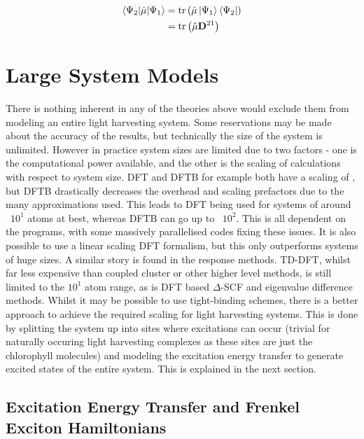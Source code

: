 \begin{equation}
\begin{split}    
\braket{\Psi_2|\hat{\mathbf{\mu}}|\Psi_1} &= \text{tr}\left(\hat{\mathbf{\mu}} \ket{\Psi_1} \bra{\Psi_2} \right) \\
&= \text{tr}\left( \hat{\mathbf{\mu}} \mathbf{D}^{21}\right)
\end{split}
\end{equation}
%
\section{Large System Models}
\label{sec:large_systems_theory}

There is nothing inherent in any of the theories above would exclude them from modeling
an entire light harvesting system. Some reservations may be made about the accuracy
of the results, but technically the size of the system is unlimited. However in 
practice system sizes are limited due to two factors - one is the computational 
power available, and the other is the scaling of calculations with respect to system
size. DFT and DFTB for example both have a scaling of , but DFTB drastically decreases
the overhead and scaling prefactors due to the many approximations used. This leads
to DFT being used for systems of around ~$10^1$ atoms at best, whereas DFTB can 
go up to ~$10^2$. This is all dependent on the programs, with some massively parallelised
codes fixing these issues. It is also possible to use a linear scaling DFT formalism,
but this only outperforms systems of huge sizes.
A similar story is found in the response methods. TD-DFT, whilst far less expensive
than coupled cluster or other higher level methods, is still limited to the $10^1$ 
atom range, as is DFT based $\Delta$-SCF and eigenvalue difference methods. Whilst
it may be possible to use tight-binding schemes, there is a better approach to achieve
the required scaling for light harvesting systems. This is done by splitting the
system up into sites where excitations can occur (trivial for naturally occuring 
light harvesting complexes as these sites are just the chlorophyll molecules) and
modeling the excitation energy transfer to generate excited states of the entire
system. This is explained in the next section.

\subsection{Excitation Energy Transfer and Frenkel Exciton Hamiltonians}
\label{subsec:frenkel_exciton_theory}


